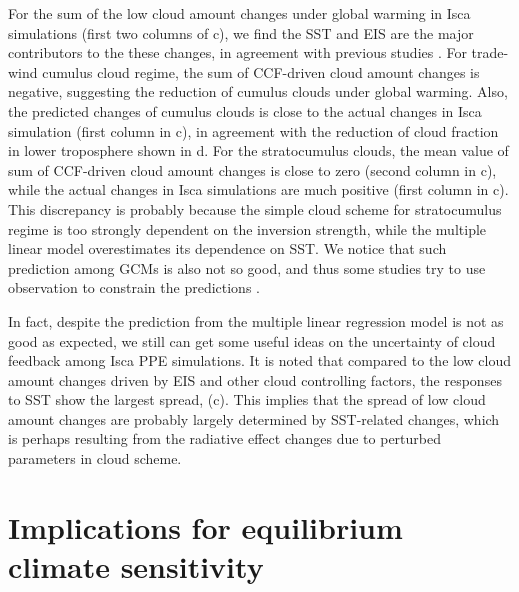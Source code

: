 For the sum of the low cloud amount changes under global warming in Isca simulations (first two columns of c), we find the SST and EIS are the major contributors to the these changes, in agreement with previous studies \citep{Myers2015relationships,Myers2016,Qu2015positive,Seethala2015,Zhou2015,McCoy2016relationships}. For trade-wind cumulus cloud regime, the sum of CCF-driven cloud amount changes is negative, suggesting the reduction of cumulus clouds under global warming. Also, the predicted changes of cumulus clouds is close to the actual changes in Isca simulation (first column in c), in agreement with the reduction of cloud fraction in lower troposphere shown in d. For the stratocumulus clouds, the mean value of sum of CCF-driven cloud amount changes is close to zero (second column in c), while the actual changes in Isca simulations are much positive (first column in c). This discrepancy is probably because the simple cloud scheme for stratocumulus regime is too strongly dependent on the inversion strength, while the multiple linear model overestimates its dependence on SST. We notice that such prediction among GCMs is also not so good, and thus some studies try to use observation to constrain the predictions \citep{Myers2016,Myers2021}. 

In fact, despite the prediction from the multiple linear regression model is not as good as expected, we still can get some useful ideas on the uncertainty of cloud feedback among Isca PPE simulations. It is noted that compared to the low cloud amount changes driven by EIS and other cloud controlling factors, the responses to SST show the largest spread,  (c). This implies that the spread of low cloud amount changes are probably largely determined by SST-related changes, which is perhaps resulting from the radiative effect changes due to perturbed parameters in cloud scheme.

\section{Implications for equilibrium climate sensitivity}
\label{sec:implification_for_ECS}



